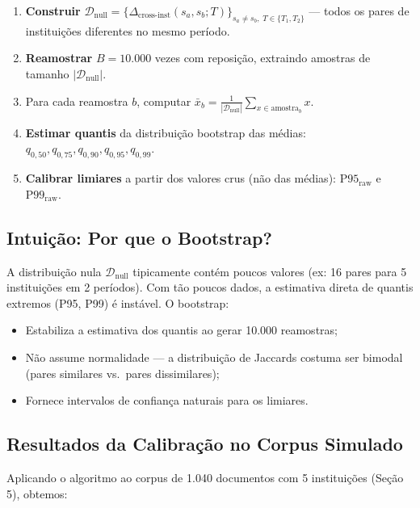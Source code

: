 \documentclass[12pt,a4paper]{article}
\theoremstyle{remark}
\begin{document}
\begin{enumerate}[nosep]
  \item \textbf{Construir} $\mathcal{D}_{\text{null}} = \{\Delta_{\text{cross-inst}}(s_a, s_b; T)\}_{s_a \neq s_b,\; T \in \{T_1,T_2\}}$ — todos os pares de instituições diferentes no mesmo período.
  \item \textbf{Reamostrar} $B = 10.000$ vezes com reposição, extraindo amostras de tamanho $|\mathcal{D}_{\text{null}}|$.
  \item Para cada reamostra $b$, computar $\bar{x}_b = \frac{1}{|\mathcal{D}_{\text{null}}|}\sum_{x \in \text{amostra}_b} x$.
  \item \textbf{Estimar quantis} da distribuição bootstrap das médias: $q_{0,50}, q_{0,75}, q_{0,90}, q_{0,95}, q_{0,99}$.
  \item \textbf{Calibrar limiares} a partir dos valores crus (não das médias): $\text{P95}_{\text{raw}}$ e $\text{P99}_{\text{raw}}$.
\end{enumerate}

\subsection{Intuição: Por que o Bootstrap?}

A distribuição nula $\mathcal{D}_{\text{null}}$ tipicamente contém poucos valores (ex: 16 pares para 5 instituições em 2 períodos). Com tão poucos dados, a estimativa direta de quantis extremos (P95, P99) é instável. O bootstrap:
\begin{itemize}[nosep]
  \item Estabiliza a estimativa dos quantis ao gerar 10.000 reamostras;
  \item Não assume normalidade — a distribuição de Jaccards costuma ser bimodal (pares similares vs.\ pares dissimilares);
  \item Fornece intervalos de confiança naturais para os limiares.
\end{itemize}

\subsection{Resultados da Calibração no Corpus Simulado}

Aplicando o algoritmo ao corpus de 1.040 documentos com 5 instituições (Seção 5), obtemos:
\end{document}
